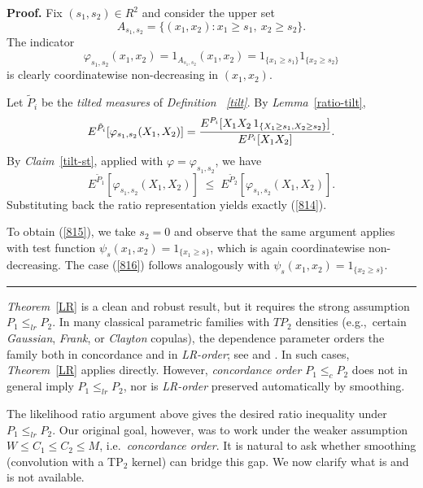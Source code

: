 \documentclass[onecolumn]{article}
\newenvironment{proof}[1][Proof]{\noindent\textbf{#1.} }{\ \rule{0.5em}{0.5em}}
\begin{document}
\begin{proof}
Fix $(s_{1},s_{2})\in R^{2}$ and consider the upper set 
\begin{equation}
A_{s_{1},s_{2}}=\{(x_{1},x_{2})\colon x_{1}\geq s_{1},\ x_{2}\geq s_{2}\}.
\label{817}
\end{equation}%
The indicator 
\begin{equation}
\varphi
_{s_{1},s_{2}}(x_{1},x_{2})=1_{A_{s_{1},s_{2}}}(x_{1},x_{2})=1_{\{x_{1}\geq
s_{1}\}}1_{\{x_{2}\geq s_{2}\}}  \label{818}
\end{equation}%
is clearly coordinatewise non-decreasing in $(x_{1},x_{2})$.

Let $\tilde{P}_{i}$ be the \textit{tilted measures} of \textit{Definition~%
\ref{tilt}}. By \textit{Lemma}~\ref{ratio-tilt}, 
\begin{equation}
E^{\tilde{P}_{i}}[\varphi _{s_{1},s_{2}}(X_{1},X_{2})]=\frac{%
E^{P_{i}}[X_{1}X_{2}\,1_{\{X_{1}\geq s_{1},X_{2}\geq s_{2}\}}]}{%
E^{P_{i}}[X_{1}X_{2}]}.  \label{819}
\end{equation}%
By \textit{Claim}~\ref{tilt-st}, applied with $\varphi =\varphi
_{s_{1},s_{2}}$, we have 
\begin{equation}
E^{\tilde{P}_{1}}[\varphi _{s_{1},s_{2}}(X_{1},X_{2})]\;\leq \;E^{\tilde{P}%
_{2}}[\varphi _{s_{1},s_{2}}(X_{1},X_{2})].  \label{820}
\end{equation}%
Substituting back the ratio representation yields exactly (\ref{814}).

To obtain (\ref{815}), we take $s_{2}=0$ and observe that the same argument
applies with test function $\psi _{s}(x_{1},x_{2})=1_{\{x_{1}\geq s\}}$,
which is again coordinatewise non-decreasing. The case (\ref{816}) follows
analogously with $\psi _{s}(x_{1},x_{2})=1_{\{x_{2}\geq s\}}$.
\end{proof}

\textit{Theorem}~\ref{LR} is a clean and robust result, but it requires the
strong assumption $P_{1}\leq _{lr}P_{2}$. In many classical parametric
families with $TP_{2}$ densities (e.g.,\ certain \textit{Gaussian}, \textit{%
Frank}, or \textit{Clayton} copulas), the dependence parameter orders the
family both in concordance and in \textit{LR-order}; see \cite{[24]} and 
\cite{[32]}. In such cases, \textit{Theorem}~\ref{LR} applies directly.
However, \textit{concordance order} $P_{1}\leq _{c}P_{2}$ does not in
general imply $P_{1}\leq _{lr}P_{2}$, nor is \textit{LR-order} preserved
automatically by smoothing.

The likelihood ratio argument above gives the desired ratio inequality under 
$P_{1}\leq _{lr}P_{2}$. Our original goal, however, was to work under the
weaker assumption $W\leq C_{1}\leq C_{2}\leq M$, i.e.\ \textit{concordance
order}. It is natural to ask whether smoothing (convolution with a TP$_{2}$
kernel) can bridge this gap. We now clarify what is and is not available.
\end{document}
